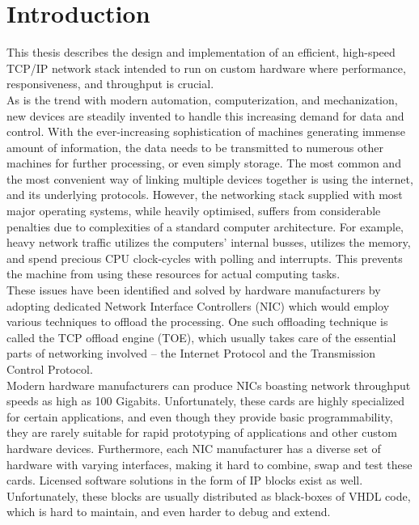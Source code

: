 \chapter{Introduction}
This thesis describes the design and implementation of an efficient, high-speed
TCP/IP network stack intended to run on custom hardware where performance, responsiveness,
and throughput is crucial.\\

As is the trend with modern automation, computerization, and mechanization, new
devices are steadily invented to handle this increasing demand for data and
control.
With the ever-increasing sophistication of machines generating immense amount
of information, the data needs to be transmitted to numerous other machines for
further processing, or even simply storage. The most common and the most convenient
way of linking multiple devices together is using the internet, and its underlying
protocols. However, the networking stack supplied with most major operating
systems, while heavily optimised, suffers from considerable penalties due to
complexities of a standard computer architecture. For example, heavy network
traffic utilizes the computers' internal busses, utilizes the memory, and spend
precious CPU clock-cycles with polling and interrupts. This
prevents the machine from using these resources for actual computing tasks.\\
These issues have been identified and solved by hardware manufacturers by
adopting dedicated Network Interface Controllers (NIC) which would employ
various techniques to offload the processing. One such offloading technique is
called the TCP offload engine (TOE), which usually takes care of the essential
parts of networking involved -- the Internet Protocol and the Transmission
Control Protocol\cite{TCP_offload_dumb_idea}.\\
Modern hardware manufacturers can produce NICs boasting network throughput
speeds as high as 100 Gigabits\cite{xilinx_100g_nic}. Unfortunately, these cards
are highly specialized for certain applications, and even though they provide
basic programmability, they are rarely suitable for rapid prototyping of
applications and other custom hardware devices. Furthermore, each NIC manufacturer
has a diverse set of hardware with varying interfaces, making it hard to
combine, swap and test these cards.
Licensed software solutions in the form of IP blocks exist as well. Unfortunately,
these blocks are usually distributed as black-boxes of VHDL code, which is
hard to maintain, and even harder to debug and extend.  \\

